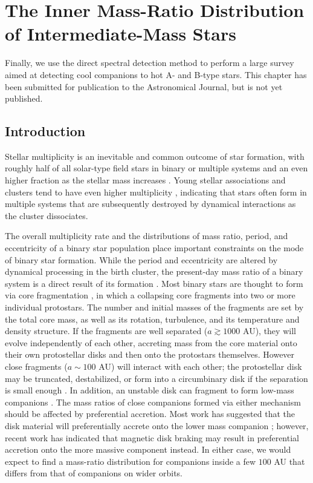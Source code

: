 
\chapter{The Inner Mass-Ratio Distribution of Intermediate-Mass Stars}
\label{chap:survey}

Finally, we use the direct spectral detection method to perform a large survey aimed at detecting cool companions to hot A- and B-type stars. This chapter has been submitted for publication to the Astronomical Journal, but is not yet published.



\section{Introduction}
\label{paper6_sec:intro}

Stellar multiplicity is an inevitable and common outcome of star formation, with roughly half of all solar-type field stars in binary or multiple systems \citep{Raghavan2010} and an even higher fraction as the stellar mass increases \citep{Zinnecker2007}. Young stellar associations and clusters tend to have even higher multiplicity \citep{Duchene2013}, indicating that stars often form in multiple systems that are subsequently destroyed by dynamical interactions as the cluster dissociates. 

The overall multiplicity rate and the distributions of mass ratio, period, and eccentricity of a binary star population place important constraints on the mode of binary star formation. While the period and eccentricity are altered by dynamical processing in the birth cluster, the present-day mass ratio of a binary system is a direct result of its formation \citep{Parker2013}. Most binary stars are thought to form via core fragmentation \citep{Boss1979, Boss1986, Bate1995}, in which a collapsing core fragments into two or more individual protostars. The number and initial masses of the fragments are set by the total core mass, as well as its rotation, turbulence, and its temperature and density structure. If the fragments are well separated ($a \gtrsim 1000$ AU), they will evolve independently of each other, accreting mass from the core material onto their own protostellar disks and then onto the protostars themselves. However close fragments ($a \sim 100$ AU) will interact with each other; the protostellar disk may be truncated, destabilized, or form into a circumbinary disk if the separation is small enough \citep{Bate1997}. In addition, an unstable disk can fragment to form low-mass companions \citep{Kratter2006, Stamatellos2011}. The mass ratios of close companions formed via either mechanism should be affected by preferential accretion. Most work has suggested that the disk material will preferentially accrete onto the lower mass companion \citep{Bate1997, BBB2002}; however, recent work has indicated that magnetic disk braking may result in preferential accretion onto the more massive component \citep{Zhao2013} instead. In either case, we would expect to find a mass-ratio distribution for companions inside a few $100$ AU that differs from that of companions on wider orbits.

